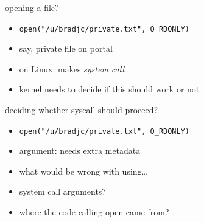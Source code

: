 \begin{frame}{opening a file?}
\begin{itemize}
\item \texttt{open("/u/bradjc/private.txt", O\_RDONLY)}
\item say, private file on portal
\vspace{.5cm}
\item on Linux: makes \textit{system call}
\item kernel needs to decide if this should work or not
\end{itemize}
\end{frame}



\begin{frame}{deciding whether syscall should proceed?}
\begin{itemize}
\item \texttt{open("/u/bradjc/private.txt", O\_RDONLY)}
\item argument: needs extra metadata
\vspace{.5cm}
\item what would be wrong with using\ldots
\item system call arguments?
\item where the code calling open came from?
\end{itemize}
\end{frame}

